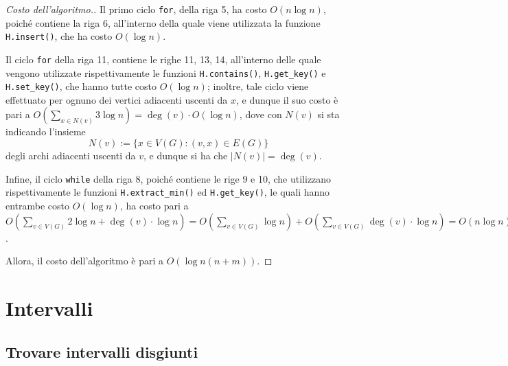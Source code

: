 \documentclass[a4paper, 12pt]{report}
\begin{document}
    \begin{proof}[Costo dell'algoritmo.]
        Il primo ciclo \texttt{for}, della riga 5, ha costo $O(n \log n)$, poiché contiene la riga 6, all'interno della quale viene utilizzata la funzione \texttt{H.insert()}, che ha costo $O(\log n)$.

        Il ciclo \texttt{for} della riga 11, contiene le righe 11, 13, 14, all'interno delle quale vengono utilizzate rispettivamente le funzioni \texttt{H.contains()}, \texttt{H.get\_key()} e \texttt{H.set\_key()}, che hanno tutte costo $O(\log n)$; inoltre, tale ciclo viene effettuato per ognuno dei vertici adiacenti uscenti da $x$, e dunque il suo costo è pari a $\displaystyle O \left( \sum_{x \in N(v)} 3 \log n \right) = \deg(v) \cdot O(\log n)$, dove con $N(v)$ si sta indicando l'insieme $$N (v) := \{x \in V(G) : (v, x) \in E(G)\}$$ degli archi adiacenti uscenti da $v$, e dunque si ha che $\left|N(v)\right| = \deg(v)$.

        Infine, il ciclo \texttt{while} della riga 8, poiché contiene le rige 9 e 10, che utilizzano rispettivamente le funzioni \texttt{H.extract\_min()} ed \texttt{H.get\_key()}, le quali hanno entrambe costo $O(\log n)$, ha costo pari a $\displaystyle O \left( \sum_{v \in V(G)} 2 \log n + \deg(v) \cdot \log n \right) = O \left( \sum_{v \in V(G)} \log n \right) + O \left ( \sum_{v \in V(G)} \deg(v) \cdot \log n \right) = O(n \log n) + \log n \cdot O (m )$.

        Allora, il costo dell'algoritmo è pari a $O (\log n (n + m))$.
    \end{proof}

    \section{Intervalli}

    \subsection{Trovare intervalli disgiunti}
\end{document}

